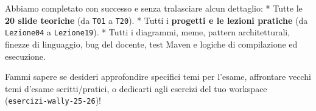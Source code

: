 \documentclass[11pt,a4paper]{article}
\newcommand{\passthrough}[1]{#1}
\begin{document}
Abbiamo completato con successo e senza tralasciare alcun dettaglio: *
Tutte le \textbf{20 slide teoriche} (da \passthrough{\lstinline!T01!} a
\passthrough{\lstinline!T20!}). * Tutti i \textbf{progetti e le lezioni
pratiche} (da \passthrough{\lstinline!Lezione04!} a
\passthrough{\lstinline!Lezione19!}). * Tutti i diagrammi, meme, pattern
architetturali, finezze di linguaggio, bug del docente, test Maven e
logiche di compilazione ed esecuzione.

Fammi sapere se desideri approfondire specifici temi per l'esame,
affrontare vecchi temi d'esame scritti/pratici, o dedicarti agli
esercizi del tuo workspace
(\passthrough{\lstinline!esercizi-wally-25-26!})!
\end{document}
